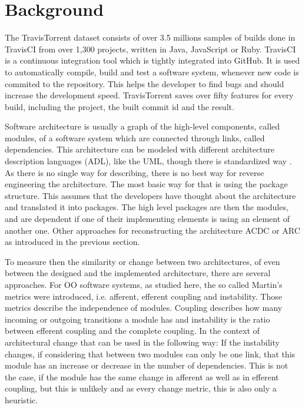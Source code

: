 \documentclass[conference]{IEEEtran}
\begin{document}
\section{Background}

The TravisTorrent dataset \cite{TravisTorrent} consists of over 3.5 millions samples of builds done in TravisCI from over 1,300 projects, written in Java, JavaScript or Ruby. TravisCI is a continuous integration tool which is tightly integrated into GitHub. It is used to automatically compile, build and test a software system, whenever new code is commited to the repository. This helps the developer to find bugs and should increase the development speed. 
TravisTorrent saves over fifty features for every build, including the project, the built commit id and the result.

Software architecture is usually a graph of the high-level components, called modules, of a software system which are connected through links, called dependencies. This architecture can be modeled with different architecture description languages (ADL), like the UML, though there is standardized way \cite{UML-Arch}. 
As there is no single way for describing, there is no best way for reverse engineering the architecture. The most basic way for that is using the package structure. This assumes that the developers have thought about the architecture and translated it into packages. The high level packages are then the modules, and are dependent if one of their implementing elements is using an element of another one. 
Other approaches for reconstructing the architecture ACDC or ARC as introduced in the previous section.

To measure then the similarity or change between two architectures, of even between the designed and the implemented architecture, there are several approaches. For OO software systems, as studied here, the so called Martin's metrics \cite{martinsMetrics} were introduced, i.e. afferent, efferent coupling and instability. Those metrics describe the independence of modules. Coupling describes how many incoming or outgoing transitions a module has and instability is the ratio between efferent coupling and the complete coupling. 
In the context of architectural change that can be used in the following way: If the instability changes, if considering that between two modules can only be one link, that this module has an increase or decrease in the number of dependencies. This is not the case, if the module has the same change in afferent as well as in efferent coupling, but this is unlikely and as every change metric, this is also only a heuristic. 
\end{document}

